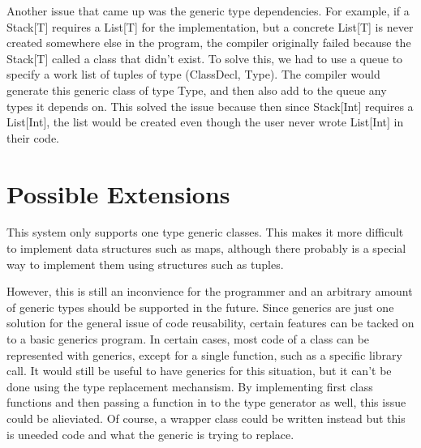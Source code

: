 \documentclass[nocopyrightspace,11pt,authoryear,preprint]{sigplanconf}
\begin{document}
Another issue that came up was the generic type dependencies.  For example,
if a Stack[T] requires a List[T] for the implementation, but a concrete List[T]
is never created somewhere else in the program,
the compiler originally failed because the Stack[T] called a class that didn't exist.
To solve this, we had to use a queue to specify a work list of tuples of type
(ClassDecl, Type).  The compiler would generate this generic class of type Type, and then
also add to the queue any types it depends on.  This solved the issue because then
since Stack[Int] requires a List[Int], the list would be created even though the user
never wrote List[Int] in their code.

\section{Possible Extensions}




This system only supports one type generic classes. This makes it more difficult
to implement data structures such as maps, although there probably is a special
way to implement them using structures such as tuples.

However, this is still an inconvience for the programmer
and an arbitrary amount of generic types should be supported in the future.
Since generics are just one solution for the general issue of code reusability,
certain features can be tacked on to a basic generics program.
In certain cases, most code of a class can be represented with generics, except
for a single function, such as a specific library call.  It would still be useful to have
generics for this situation, but it can't be done using the type replacement
mechansism.  By implementing first class functions and then passing a function in
to the type generator as well, this issue could be alieviated.  Of course,
a wrapper class could be written instead but this is uneeded code and 
what the generic is trying to replace.



\end{document}
